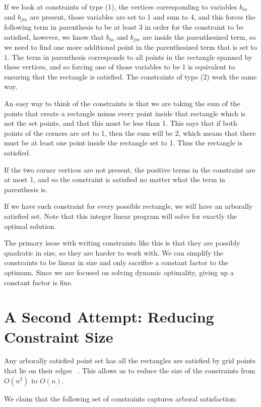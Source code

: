 \documentclass[11pt]{article}
\begin{document}
If we look at constraints of type (1), the vertices corresponding to variables $b_{in}$ and $b_{jm}$ are present, those variables are set to 1 and sum to 4, and this forces the following term in parenthesis to be at least 3 in order for the constraint to be satisfied, however, we know that $b_{in}$ and $b_{jm}$ are inside the parenthesized term, so we need to find one more additional point in the parenthesized term that is set to $1$. The term in parenthesis corresponds to all points in the rectangle spanned by these vertices, and so forcing one of those variables to be 1 is equivalent to ensuring that the rectangle is satisfied. The constraints of type (2) work the same way.

An easy way to think of the constraints is that we are taking the sum of the points that create a rectangle minus every point inside that rectangle which is not the set points, and that this must be less than 1. This says that if both points of the corners are set to 1, then the sum will be 2, which means that there must be at least one point inside the rectangle set to 1. Thus the rectangle is satisfied. 

If the two corner vertices are not present, the positive terms in the constraint are at most 1, and so the constraint is satisfied no matter what the term in parenthesis is.

If we have such constraint for every possible rectangle, we will have an arborally satisfied set. Note that this integer linear program will solve for exactly the optimal solution.

The primary issue with writing constraints like this is that they are possibly quadratic in size, so they are harder to work with. We can simplify the constraints to be linear in size and only sacrifice a constant factor to the optimum. Since we are focused on solving dynamic optimality, giving up a constant factor is fine.

\section{A Second Attempt: Reducing Constraint Size}

Any arborally satisfied point set has all the rectangles are satisfied by grid points that lie on their edges ~\cite{geometryBST}. This allows us to reduce the size of the constraints from $O(n^2)$ to $O(n)$.

We claim that the following set of constraints captures arboral satisfaction: 
\end{document}
